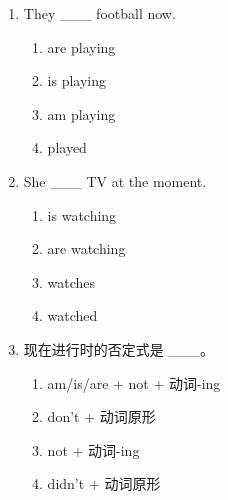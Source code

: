\documentclass[11pt,a4paper]{ctexart}
\begin{document}
\begin{enumerate}[leftmargin=*,itemsep=4pt]
\begin{enumerate}[label=\Alph*.,leftmargin=2em,itemsep=1pt,topsep=2pt]
\item 动词不定式
\end{enumerate}
\item They \_\_\_ football now.
\begin{enumerate}[label=\Alph*.,leftmargin=2em,itemsep=1pt,topsep=2pt]
\item are playing
\item is playing
\item am playing
\item played
\end{enumerate}
\item She \_\_\_ TV at the moment.
\begin{enumerate}[label=\Alph*.,leftmargin=2em,itemsep=1pt,topsep=2pt]
\item is watching
\item are watching
\item watches
\item watched
\end{enumerate}
\item 现在进行时的否定式是 \_\_\_。
\begin{enumerate}[label=\Alph*.,leftmargin=2em,itemsep=1pt,topsep=2pt]
\item am/is/are + not + 动词-ing
\item don’t + 动词原形
\item not + 动词-ing
\item didn’t + 动词原形
\end{enumerate}
\end{enumerate}
\end{document}
